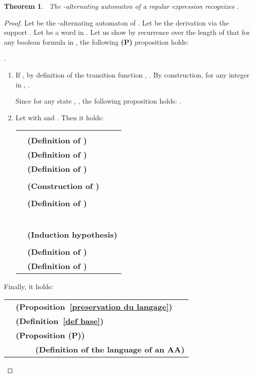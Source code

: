 \documentclass{article}
\newtheorem{theorem}{Theorem}
\begin{document}
  \begin{theorem}~\label{thm aa lang}
     The -alternating automaton of a regular expression  recognizes .
  \end{theorem}
  \begin{proof}
  Let  be the -alternating automaton of . 
    Let  be the derivation via the support . Let  be a word in . 
       Let us show by recurrence over the length of  that for any boolean formula  in , the following \textbf{(P)} proposition holds:
      
        \centerline{
          .
        }
        
        \begin{enumerate}
          \item If , by definition of the transition function ,          
             . By construction, for any integer  in , .
          
           Since for any state , , the following proposition holds:   .
          
          \item Let  with  and . Then it holds:
          
              \begin{tabular}{l@{\ }l}
                & \\
                &  \hfill\textbf{(Definition of )}\\
                &  \hfill\textbf{(Definition of )}\\
                &  \hfill\textbf{(Definition of )}\\
                & \\ & \hfill\textbf{(Construction of )}\\
                &  \\ & \hfill\textbf{(Definition of )}\\
                & \\
                &\ \ \ \ \ \ \ \ \ \ \ \ \ \ \ \ \ \ \ \ \\ &  \hfill\textbf{(Induction hypothesis)}\\
                & \\ &  \hfill\textbf{(Definition of )}\\
                &  \hfill\textbf{(Definition of )}\\
              \end{tabular}
        \end{enumerate}
        
        Finally, it holds:
        
          \begin{tabular}{l@{\ }l}
             &   \hfill\textbf{(Proposition~\ref{preservation du langage})}\\
            &   \hfill\textbf{(Definition~\ref{def base})}\\
            &   \hfill\textbf{(Proposition \textbf{(P)})}\\
            &  \ \ \ \ \ \hfill\textbf{(Definition of the language of an AA)}\\
          \end{tabular}
          
    
\end{proof}
  
\end{document}
